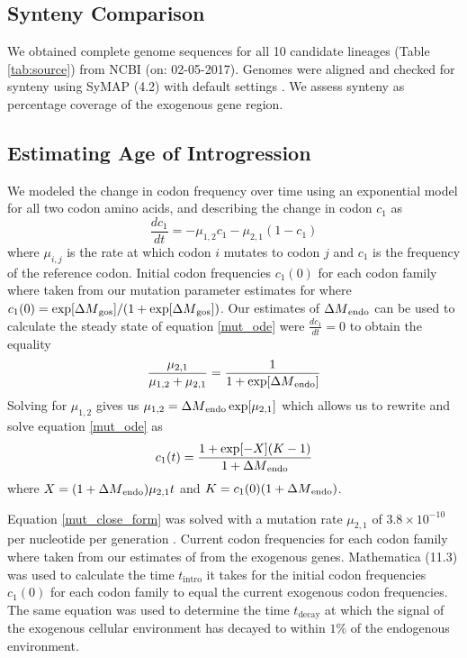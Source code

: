 \documentclass[fleqn,letterpaper]{article}
\begin{document}
\subsection*{Synteny Comparison}
We obtained complete genome sequences for all 10 candidate lineages (Table \ref{tab:source}) from NCBI (on: 02-05-2017).
Genomes were aligned and checked for synteny using SyMAP (4.2) with default settings \citep{soderlund2006, soderlund2011}.
We assess synteny as percentage coverage of the exogenous gene region.

\subsection*{Estimating Age of Introgression}
We modeled the change in codon frequency over time using an exponential model for all two codon amino acids, and describing the change in codon $c_1$ as
\begin{equation}
\frac{d c_1}{d t} = -\mu_{1,2}c_1 - \mu_{2,1}(1-c_1)
\label{mut_ode}
\end{equation}
where $\mu_{i,j}$ is the rate at which codon $i$ mutates to codon $j$ and $c_1$ is the frequency of the reference codon.
Initial codon frequencies $c_1(0)$ for each codon family where taken from our mutation parameter estimates for \gossypii where $c_1(0) = \exp[{\Delta M}_\text{gos}]/(1+\exp[{\Delta M}_\text{gos}])$. 
Our estimates of ${\Delta M}_\text{endo}$ can be used to calculate the steady state of equation \ref{mut_ode} were $\frac{d c_1}{d t} = 0$ to obtain the equality
\begin{equation}
\frac{\mu_{2,1}}{\mu_{1,2} + \mu_{2,1}} = \frac{1}{1+\exp[{\Delta M}_\text{endo}]}
\end{equation}
Solving for $\mu_{1,2}$ gives us $\mu_{1,2} = {\Delta M}_\text{endo}\exp[\mu_{2,1}]$ which allows us to rewrite and solve equation \ref{mut_ode} as
\begin{equation}
c_1(t) = \frac{ 1 + \exp[-X](K-1) }{ 1+{\Delta M}_\text{endo} }
\label{mut_close_form}
\end{equation}
where $X = (1+{\Delta M}_\text{endo})\mu_{2,1}t$ and $K = c_1(0)(1+{\Delta M}_\text{endo}) $.

Equation \ref{mut_close_form} was solved with a mutation rate $\mu_{2,1}$ of $3.8\times 10^{-10}$ per nucleotide per generation \citep{lang2008}. 
Current codon frequencies for each codon family where taken from our estimates of \DM from the exogenous genes.
Mathematica (11.3) \citep{Mathematica11} was used to calculate the time $t_\text{intro}$ it takes for the initial codon frequencies $c_1(0)$ for each codon family to equal the current exogenous codon frequencies.
The same equation was used to determine the time $t_\text{decay}$ at which the signal of the exogenous cellular environment has decayed to within $1 \%$ of the endogenous environment.
\end{document}
